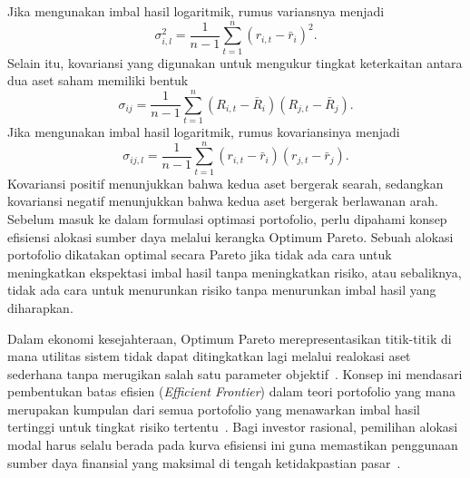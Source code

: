 Jika mengunakan imbal hasil logaritmik, rumus variansnya menjadi
\begin{equation}
    \sigma_{i,l}^2 = \frac{1}{n-1} \sum_{t=1}^n (r_{i,t} - \bar{r}_i)^2.
\end{equation}
Selain itu, kovariansi yang digunakan untuk mengukur tingkat keterkaitan antara dua aset saham memiliki bentuk 
\begin{equation}
    \sigma_{ij} = \frac{1}{n-1} \sum_{t=1}^n (R_{i,t} - \bar{R}_i)(R_{j,t} - \bar{R}_j).
\end{equation}
Jika mengunakan imbal hasil logaritmik, rumus kovariansinya menjadi
\begin{equation}
    \sigma_{ij,l} = \frac{1}{n-1} \sum_{t=1}^n (r_{i,t} - \bar{r}_i)(r_{j,t} - \bar{r}_j).
\end{equation}
Kovariansi positif menunjukkan bahwa kedua aset bergerak searah, sedangkan kovariansi negatif menunjukkan bahwa kedua aset bergerak berlawanan arah. Sebelum masuk ke dalam formulasi optimasi portofolio, perlu dipahami konsep efisiensi alokasi sumber daya melalui kerangka Optimum Pareto. Sebuah alokasi portofolio dikatakan optimal secara Pareto jika tidak ada cara untuk meningkatkan ekspektasi imbal hasil tanpa meningkatkan risiko, atau sebaliknya, tidak ada cara untuk menurunkan risiko tanpa menurunkan imbal hasil yang diharapkan.

Dalam ekonomi kesejahteraan, Optimum Pareto merepresentasikan titik-titik di mana utilitas sistem tidak dapat ditingkatkan lagi melalui realokasi aset sederhana tanpa merugikan salah satu parameter objektif~. Konsep ini mendasari pembentukan batas efisien (\textit{Efficient Frontier}) dalam teori portofolio yang mana merupakan kumpulan dari semua portofolio yang menawarkan imbal hasil tertinggi untuk tingkat risiko tertentu~. Bagi investor rasional, pemilihan alokasi modal harus selalu berada pada kurva efisiensi ini guna memastikan penggunaan sumber daya finansial yang maksimal di tengah ketidakpastian pasar~.

